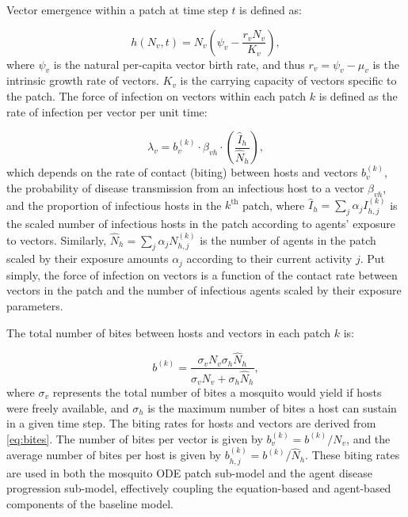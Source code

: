 Vector emergence within a patch at time step $t$ is defined as:

\begin{equation}
h(N_v,t)=N_v\left(\psi_v - \frac{r_v N_v}{K_v}\right),
\end{equation}
where $\psi_v$ is the natural per-capita vector birth rate, and thus $r_v=\psi_v-\mu_v$ is the intrinsic growth rate of vectors. $K_v$ is the carrying capacity of vectors specific to the patch. The force of infection on vectors within each patch $k$ is defined as the rate of infection per vector per unit time:

\begin{equation}
    \lambda_v=b^{(k)}_v\cdot \beta_{vh}\cdot \left( \frac{\hat{I}_h}{\hat{N}_h} \right),
\end{equation}\label{eq:lambda-v}
which depends on the rate of contact (biting) between hosts and vectors $b^{(k)}_v$, the probability of disease transmission from an infectious host to a vector $\beta_{vh}$, and the proportion of infectious hosts in the $k^{\text{th}}$ patch, where $\hat{I}_h=\sum_j{\alpha_j I^{(k)}_{h,j}}$ is the scaled number of infectious hosts in the patch according to agents' exposure to vectors. Similarly, $\hat{N}_h=\sum_j{\alpha_j N^{(k)}_{h,j}}$ is the number of agents in the patch scaled by their exposure amounts $\alpha_j$ according to their current activity $j$. Put simply, the force of infection on vectors is a function of the contact rate between vectors in the patch and the number of infectious agents scaled by their exposure parameters.

The total number of bites between hosts and vectors in each patch $k$ is:%

\begin{equation}\label{eq:bites}
    b^{(k)}=\frac{\sigma_v N_v \sigma_h \hat{N}_h}{\sigma_v N_v + \sigma_h \hat{N}_h},
\end{equation}
where $\sigma_v$ represents the total number of bites a mosquito would yield if hosts were freely available, and $\sigma_h$ is the maximum number of bites a host can sustain in a given time step. The biting rates for hosts and vectors are derived from \eqref{eq:bites}. The number of bites per vector is given by $b^{(k)}_v=b^{(k)}/N_v$, and the average number of bites per host is given by $b_{h,j}^{(k)}=b^{(k)}/\hat{N}_h$. These biting rates are used in both the mosquito ODE patch sub-model and the agent disease progression sub-model, effectively coupling the equation-based and agent-based components of the baseline model.

